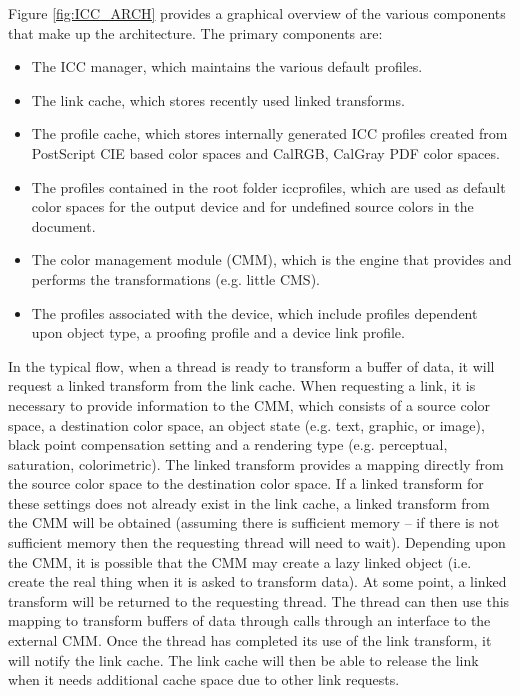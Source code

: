 \documentclass[12pt,notitlepage]{article}
\begin{document}
Figure \ref{fig:ICC_ARCH} provides a graphical overview of the various components that make up the architecture.  The primary components are:
\begin{itemize}
\item  The ICC manager, which maintains the various default profiles.
\item The link cache, which stores recently used linked transforms.
\item The profile cache, which stores internally generated ICC profiles created from PostScript CIE based color spaces and CalRGB, CalGray PDF color spaces.
\item The profiles contained in the root folder iccprofiles, which are used as default color spaces for the output device and for undefined source colors in the document.
\item The color management module (CMM), which is the engine that provides and performs the transformations (e.g. little CMS).
\item The profiles associated with the device, which include profiles dependent upon object type, a proofing profile and a device link profile.
\end{itemize}
In the typical flow, when a thread is ready to transform a buffer of data, it will request a linked transform from the link cache. When requesting a link, it is necessary to provide information to the CMM, which consists of a source color space, a destination color space, an object state (e.g. text, graphic, or image), black point compensation setting and a rendering type (e.g. perceptual, saturation, colorimetric).  The linked transform provides a mapping directly from the source color space to the destination color space. If a linked transform for these settings does not already exist in the link cache, a linked transform from the CMM will be obtained (assuming there is sufficient memory -- if there is not sufficient memory then the requesting thread will need to wait).  Depending upon the CMM, it is possible that the CMM may create a lazy linked object (i.e. create the real thing when it is asked to transform data).  At some point, a linked transform will be returned to the requesting thread.  The thread can then use this mapping to transform buffers of data through calls through an interface to the external CMM.  Once the thread has completed its use of the link transform, it will notify the link cache.  The link cache will then be able to release the link when it needs additional cache space due to other link requests.
\end{document}
